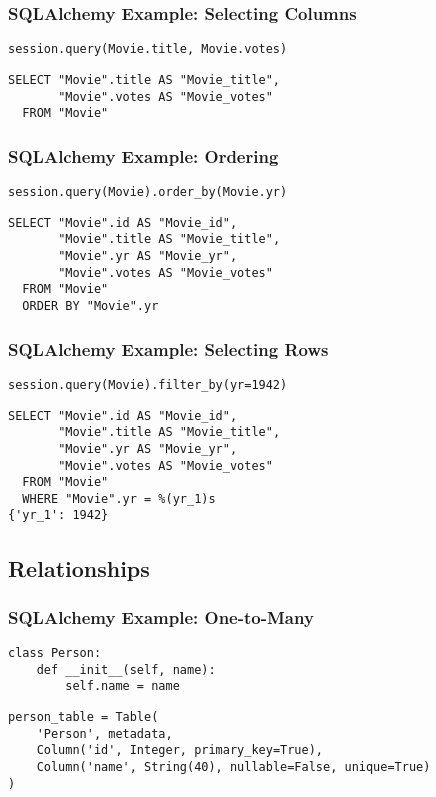 \documentclass[dvipsnames]{beamer}
\theoremstyle{plain}
\begin{document}
\begin{frame}[fragile]
  \frametitle{SQLAlchemy Example: Selecting Columns}

  \begin{lstlisting}
session.query(Movie.title, Movie.votes)
  \end{lstlisting}

  \begin{lstlisting}[language=FullSQL]
SELECT "Movie".title AS "Movie_title",
       "Movie".votes AS "Movie_votes"
  FROM "Movie"
  \end{lstlisting}
\end{frame}

\begin{frame}[fragile]
  \frametitle{SQLAlchemy Example: Ordering}

  \begin{lstlisting}
session.query(Movie).order_by(Movie.yr)
  \end{lstlisting}

  \begin{lstlisting}[language=FullSQL]
SELECT "Movie".id AS "Movie_id",
       "Movie".title AS "Movie_title",
       "Movie".yr AS "Movie_yr",
       "Movie".votes AS "Movie_votes"
  FROM "Movie"
  ORDER BY "Movie".yr
  \end{lstlisting}
\end{frame}

\begin{frame}[fragile]
  \frametitle{SQLAlchemy Example: Selecting Rows}

  \begin{lstlisting}
session.query(Movie).filter_by(yr=1942)
  \end{lstlisting}

  \begin{lstlisting}[language=FullSQL]
SELECT "Movie".id AS "Movie_id",
       "Movie".title AS "Movie_title",
       "Movie".yr AS "Movie_yr",
       "Movie".votes AS "Movie_votes"
  FROM "Movie"
  WHERE "Movie".yr = %(yr_1)s
{'yr_1': 1942}
  \end{lstlisting}
\end{frame}

\subsection{Relationships}

\begin{frame}[fragile]
  \frametitle{SQLAlchemy Example: One-to-Many}

  \begin{lstlisting}
class Person:
    def __init__(self, name):
        self.name = name
  \end{lstlisting}

  \begin{lstlisting}
person_table = Table(
    'Person', metadata,
    Column('id', Integer, primary_key=True),
    Column('name', String(40), nullable=False, unique=True)
)
  \end{lstlisting}
\end{frame}
\end{document}
